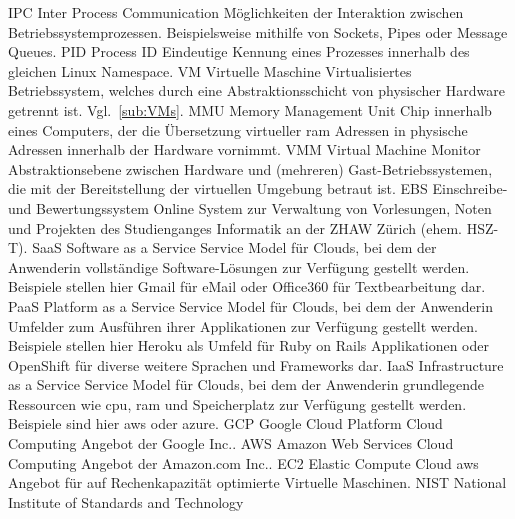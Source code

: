   {IPC}               %
  {Inter Process Communication}  %
  {Möglichkeiten der Interaktion zwischen Betriebssystemprozessen. Beispielsweise mithilfe von Sockets, Pipes oder Message Queues.}
  {PID}               %
  {Process ID}  %
  {Eindeutige Kennung eines Prozesses innerhalb des gleichen Linux Namespace.}
  {VM}
  {Virtuelle Maschine}
  {Virtualisiertes Betriebssystem, welches durch eine Abstraktionsschicht von physischer Hardware getrennt ist. Vgl.~\ref{sub:VMs}.}
  {MMU}
  {Memory Management Unit}
  {Chip innerhalb eines Computers, der die Übersetzung virtueller \gls{ram} Adressen in physische Adressen innerhalb der Hardware vornimmt.}
  {VMM}
  {Virtual Machine Monitor}
  {Abstraktionsebene zwischen Hardware und (mehreren) Gast-Betriebssystemen, die mit der Bereitstellung der virtuellen Umgebung betraut ist.}
  {EBS}
  {Einschreibe- und Bewertungssystem}
  {Online System zur Verwaltung von Vorlesungen, Noten und Projekten des Studienganges Informatik an der ZHAW Zürich (ehem. HSZ-T).}
  {SaaS}
  {Software as a Service}
  {Service Model für Clouds, bei dem der Anwenderin vollständige Software-Lösungen zur Verfügung gestellt werden. Beispiele stellen hier Gmail für eMail oder Office360 für Textbearbeitung dar.}
  {PaaS}
  {Platform as a Service}
  {Service Model für Clouds, bei dem der Anwenderin Umfelder zum Ausführen ihrer Applikationen zur Verfügung gestellt werden. Beispiele stellen hier Heroku als Umfeld für Ruby on Rails Applikationen oder OpenShift für diverse weitere Sprachen und Frameworks dar.}
  {IaaS}
  {Infrastructure as a Service}
  {Service Model für Clouds, bei dem der Anwenderin grundlegende Ressourcen wie \gls{cpu}, \gls{ram} und Speicherplatz zur Verfügung gestellt werden. Beispiele sind hier \gls{aws} oder \gls{azure}.}
  {GCP}
  {Google Cloud Platform}
  {Cloud Computing Angebot der Google Inc..}
  {AWS}               %
  {Amazon Web Services}
  {Cloud Computing Angebot der Amazon.com Inc..}
  {EC2}               %
  {Elastic Compute Cloud}
  {\gls{aws} Angebot für auf Rechenkapazität optimierte Virtuelle Maschinen.}
  {NIST}               %
  {National Institute of Standards and Technology}
